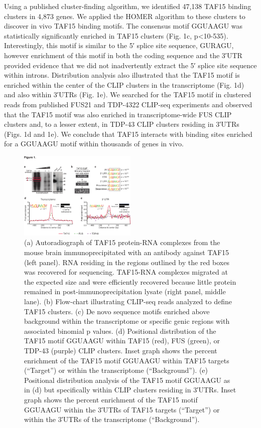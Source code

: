 Using a published cluster-finding algorithm\cite{Polymenidou2011}, we identified 47,138 TAF15 binding clusters in 4,873 genes. We applied the HOMER algorithm to these clusters to discover in vivo TAF15 binding motifs. The consensus motif GGUAAGU was statistically significantly enriched in TAF15 clusters (Fig. 1c, p<10-535). Interestingly, this motif is similar to the 5′ splice site sequence, GURAGU\cite{Shapiro1987}, however enrichment of this motif in both the coding sequence and the 3′UTR provided evidence that we did not inadvertently extract the 5′ splice site sequence within introns. Distribution analysis also illustrated that the TAF15 motif is enriched within the center of the CLIP clusters in the transcriptome (Fig. 1d) and also within 3′UTRs (Fig. 1e). We searched for the TAF15 motif in clustered reads from published FUS21 and TDP-4322 CLIP-seq experiments and observed that the TAF15 motif was also enriched in transcriptome-wide FUS CLIP clusters and, to a lesser extent, in TDP-43 CLIP clusters residing in 3′UTRs (Figs. 1d and 1e). We conclude that TAF15 interacts with binding sites enriched for a GGUAAGU motif within thousands of genes in vivo.

\begin{figure}[ht]
  \centering
  \includegraphics[width=0.5\textwidth]{chapter_2_figures/Figure_1}
  \caption[Figure 1. CLIP-seq reveals that TAF15 binds GGUAAGU motifs in the mouse brain.]{(a) Autoradiograph of TAF15 protein-RNA complexes from the mouse brain immunoprecipitated with an antibody against TAF15 (left panel). RNA residing in the regions outlined by the red boxes was recovered for sequencing. TAF15-RNA complexes migrated at the expected size and were efficiently recovered because little protein remained in post-immunoprecipitation lysate (right panel, middle lane). (b) Flow-chart illustrating CLIP-seq reads analyzed to define TAF15 clusters. (c) De novo sequence motifs enriched above background within the transcriptome or specific genic regions with associated binomial p values. (d) Positional distribution of the TAF15 motif GGUAAGU within TAF15 (red), FUS (green), or TDP-43 (purple) CLIP clusters. Inset graph shows the percent enrichment of the TAF15 motif GGUAAGU within TAF15 targets (“Target”) or within the transcriptome (“Background”). (e) Positional distribution analysis of the TAF15 motif GGUAAGU as in (d) but specifically within CLIP clusters residing in 3′UTRs. Inset graph shows the percent enrichment of the TAF15 motif GGUAAGU within the 3′UTRs of TAF15 targets (“Target”) or within the 3′UTRs of the transcriptome (“Background”).}
  \label{fig:Figure_1}
  \end{figure}

